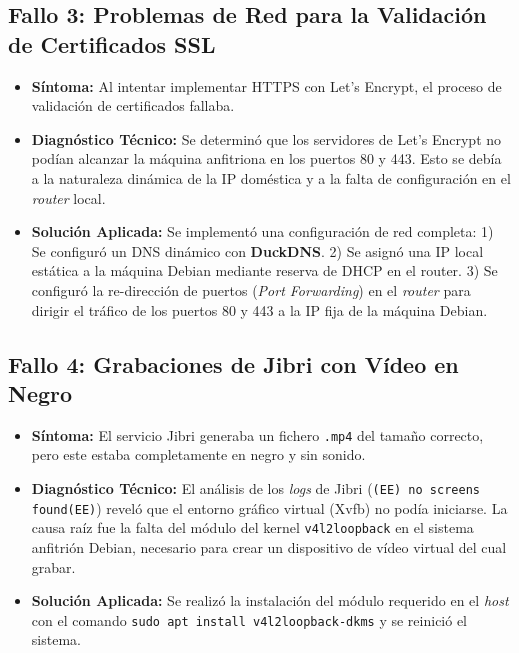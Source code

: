 \subsection{Fallo 3: Problemas de Red para la Validación de Certificados SSL}
\begin{itemize}
    \item \textbf{Síntoma:} Al intentar implementar HTTPS con Let's Encrypt, el proceso de validación de certificados fallaba.
    \item \textbf{Diagnóstico Técnico:} Se determinó que los servidores de Let's Encrypt no podían alcanzar la máquina anfitriona en los puertos 80 y 443. Esto se debía a la naturaleza dinámica de la IP doméstica y a la falta de configuración en el \textit{router} local.
    \item \textbf{Solución Aplicada:} Se implementó una configuración de red completa: 1) Se configuró un DNS dinámico con \textbf{DuckDNS}. 2) Se asignó una IP local estática a la máquina Debian mediante reserva de DHCP en el router. 3) Se configuró la re-dirección de puertos (\textit{Port Forwarding}) en el \textit{router} para dirigir el tráfico de los puertos 80 y 443 a la IP fija de la máquina Debian.
\end{itemize}

\subsection{Fallo 4: Grabaciones de Jibri con Vídeo en Negro}
\begin{itemize}
    \item \textbf{Síntoma:} El servicio Jibri generaba un fichero \texttt{.mp4} del tamaño correcto, pero este estaba completamente en negro y sin sonido.
    \item \textbf{Diagnóstico Técnico:} El análisis de los \textit{logs} de Jibri (\texttt{(EE) no screens found(EE)}) reveló que el entorno gráfico virtual (Xvfb) no podía iniciarse. La causa raíz fue la falta del módulo del kernel \texttt{v4l2loopback} en el sistema anfitrión Debian, necesario para crear un dispositivo de vídeo virtual del cual grabar.
    \item \textbf{Solución Aplicada:} Se realizó la instalación del módulo requerido en el \textit{host} con el comando \texttt{sudo apt install v4l2loopback-dkms} y se reinició el sistema.
\end{itemize}

